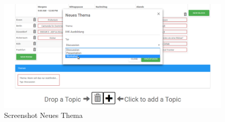 \begin{appendices}
\begin{figure}
    \centering
    \includegraphics[scale=0.5]{img/neues_thema_screenshot.png}
    \caption{Screenshot Neues Thema}
\end{figure}
\clearpage

\end{appendices}
